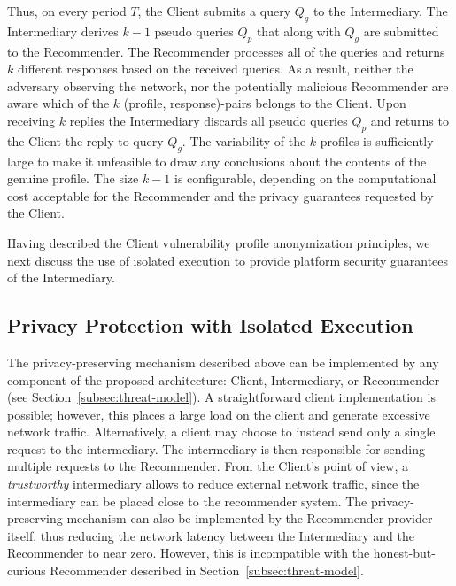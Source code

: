 {Thus, on every period $T$, the Client submits a query $Q_g$ to the Intermediary.
The Intermediary derives $k - 1$ pseudo queries $Q_p$ that along with $Q_g$ are submitted to the Recommender.
The Recommender processes all of the queries and returns $k$ different responses based on the received queries.
As a result, neither the adversary observing the network, nor the potentially malicious Recommender are aware which of the $k$ (profile, response)-pairs belongs to the Client.
Upon receiving $k$ replies the Intermediary discards all pseudo queries $Q_p$ and returns to the Client the reply to query $Q_g$.
The variability of the $k$ profiles is sufficiently large to make it unfeasible to draw any conclusions about the contents of the genuine profile.
The size $k-1$ is configurable, depending on the computational cost acceptable for the Recommender and the privacy guarantees requested by the Client.

Having described the Client vulnerability profile anonymization principles, we next discuss the use of isolated execution to provide platform security guarantees of the Intermediary.


\subsection{Privacy Protection with Isolated Execution}
\label{subsec:solution-sgx}

The privacy-preserving mechanism described above can be implemented by any component of the proposed architecture: Client, Intermediary, or Recommender (see Section~\ref{subsec:threat-model}).
A straightforward client implementation is possible;
however, this places a large load on the client and generate excessive network traffic.
Alternatively, a client may choose to instead send only a single request to the intermediary.
The intermediary is then responsible for sending multiple requests to the Recommender.
From the Client's point of view, a \textit{trustworthy} intermediary allows to reduce external network traffic, since the intermediary can be placed close to the recommender system.
The privacy-preserving mechanism can also be implemented by the Recommender provider itself, thus reducing the network latency between the Intermediary and the Recommender to near zero.
However, this is incompatible with the honest-but-curious Recommender described in Section~\ref{subsec:threat-model}.

}
